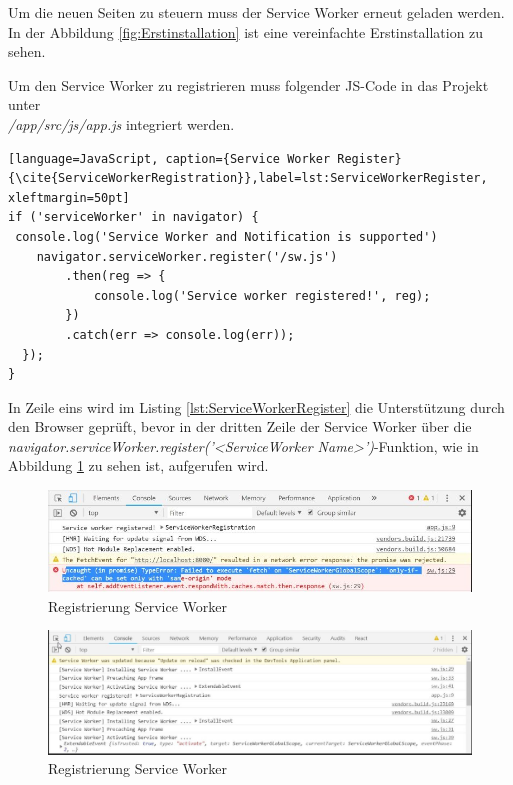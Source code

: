 Um die neuen Seiten zu steuern muss der Service Worker erneut geladen werden.
In der Abbildung \ref{fig:Erstinstallation} ist eine vereinfachte Erstinstallation zu sehen.


Um den Service Worker zu registrieren muss folgender \acs{JS}-Code in das Projekt unter \\ \textit{/app/src/js/app.js} integriert werden.
\begin{lstlisting}[language=JavaScript, caption={Service Worker Register} {\cite{ServiceWorkerRegistration}},label=lst:ServiceWorkerRegister, xleftmargin=50pt]
if ('serviceWorker' in navigator) {
 console.log('Service Worker and Notification is supported')
    navigator.serviceWorker.register('/sw.js')
        .then(reg => {
            console.log('Service worker registered!', reg);
        })
        .catch(err => console.log(err));
  });
}
\end{lstlisting}

In Zeile eins wird im Listing \ref{lst:ServiceWorkerRegister} die Unterstützung durch den Browser geprüft, bevor in der dritten Zeile der Service Worker über die\\ \textit{navigator.serviceWorker.register('<ServiceWorker Name>')}-Funktion, wie in Abbildung \ref{fig:RegistrierungSW} zu sehen ist, aufgerufen wird.
\begin{figure}[h]
	\centering
	\includegraphics[width=15cm]{BilderAllgemein/SW_Registred}\medskip
	\caption{Registrierung Service Worker}
	\label{fig:RegistrierungSW}
\end{figure}

\begin{figure}[h]
	\centering
	\includegraphics[width=15cm]{BilderAllgemein/SW_Activated}\medskip
	\caption{Registrierung Service Worker}
	\label{fig:Aktivierung}
\end{figure}


